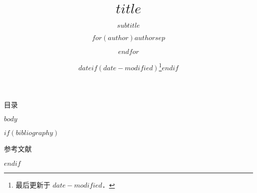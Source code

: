\documentclass[fontset=fandol,envcountsect]{ctexbeamer}
\title{$title$}
\subtitle{$subtitle$}
\author{$for(author)$$author$$sep$ \and $endfor$}
\institute{$for(institute)$$institute$$sep$ \and $endfor$}
\date{$date$$if(date-modified)$\thanks{最后更新于 $date-modified$．}$endif$}
\theoremstyle{theorem}
\theoremstyle{example}
\begin{document}
\frame{\titlepage}

\begin{frame}{目录}
  \tableofcontents
\end{frame}

$body$

$if(bibliography)$
\begin{frame}[allowframebreaks]{参考文献}
    \printbibliography[heading=none]
\end{frame}
$endif$
\end{document}
